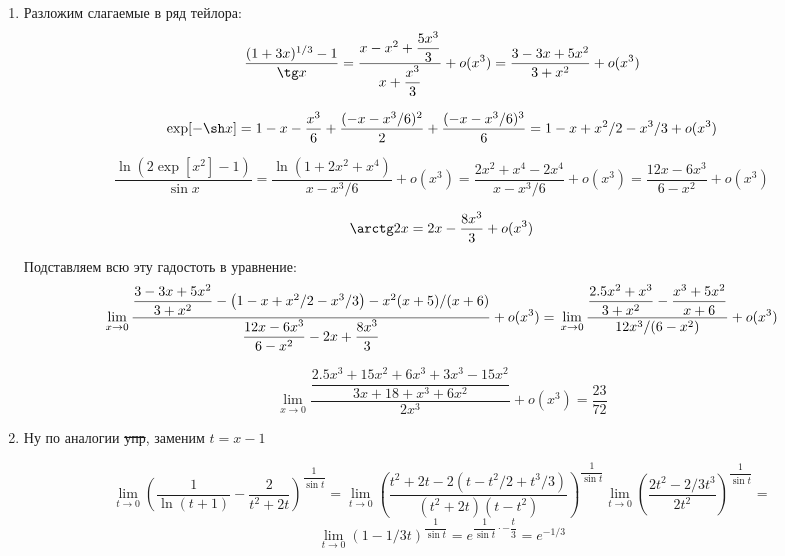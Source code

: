 \documentclass{report}
\begin{document}



\begin{enumerate}
\item
Разложим слагаемые в ряд тейлора:\\

\begin{equation*}
\dfrac{(1+3x)^{1/3}-1}{\tg x}=\dfrac{x-x^2+\dfrac{5x^3}{3}}{x+\dfrac{x^3}{3}}+o(x^3)=\dfrac{3-3x+5x^2}{3+x^2}+o(x^3)\\
\end{equation*}

\begin{equation*}
\exp[-\sh x]=1-x-\dfrac{x^3}{6}+\dfrac{(-x-x^3/6)^2}{2}+\dfrac{(-x-x^3/6)^3}{6}=1-x+x^2/2-x^3/3+o(x^3)
\end{equation*}

\begin{equation*}
\dfrac{\ln \left(2\exp[x^2]-1\right)}{\sin x}=\dfrac{\ln(1+2x^2+x^4)}{x-x^3/6}+o(x^3)=\dfrac{2x^2+x^4-2x^4}{x-x^3/6}+o(x^3)=\dfrac{12x-6x^3}{6-x^2}+o(x^3)
\end{equation*}

\[
\arctg 2x=2x-\dfrac{8x^3}{3}+o(x^3)
\]

Подставляем всю эту гадостоть в уравнение:\\

\[
\lim\limits_{x\to0}\dfrac{\dfrac{3-3x+5x^2}{3+x^2}-\left(1-x+x^2/2-x^3/3\right)-x^2(x+5)/(x+6)}{\dfrac{12x-6x^3}{6-x^2}-2x+\dfrac{8x^3}{3}}+o(x^3)=\\
\lim\limits_{x\to0}\dfrac{\dfrac{2.5x^2+x^3}{3+x^2}-\dfrac{x^3+5x^2}{x+6}}{12x^3/(6-x^2)}+o(x^3)
\]

\[
\lim\limits_{x\to0}\dfrac{\dfrac{2.5x^3+15x^2+6x^3+3x^3-15x^2}{3x+18+x^3+6x^2}}{2x^3}+o(x^3)=\dfrac{23}{72}
\]

\item
Ну по аналогии \sout{упр}, заменим $t=x-1$

\[
\lim\limits_{t\to0}\left(\dfrac{1}{\ln (t+1)}-\dfrac{2}{t^2+2t}\right)^{\dfrac{1}{\sin t}}=
\lim\limits_{t\to0}\left(\dfrac{t^2+2t-2(t-t^2/2+t^3/3)}{(t^2+2t)(t-t^2)}\right)^{\dfrac{1}{\sin t}}
\lim\limits_{t\to0}\left(\dfrac{2t^2-2/3t^3}{2t^2}\right)^{\dfrac{1}{\sin t}}=
\]
\[
\lim\limits_{t\to0}\left( 1-1/3t\right)^{\dfrac{1}{\sin t}}=e^{\dfrac{1}{\sin t}\cdot-\dfrac{t}{3}}=e^{-1/3}
\]
\end{enumerate}
\end{document}
